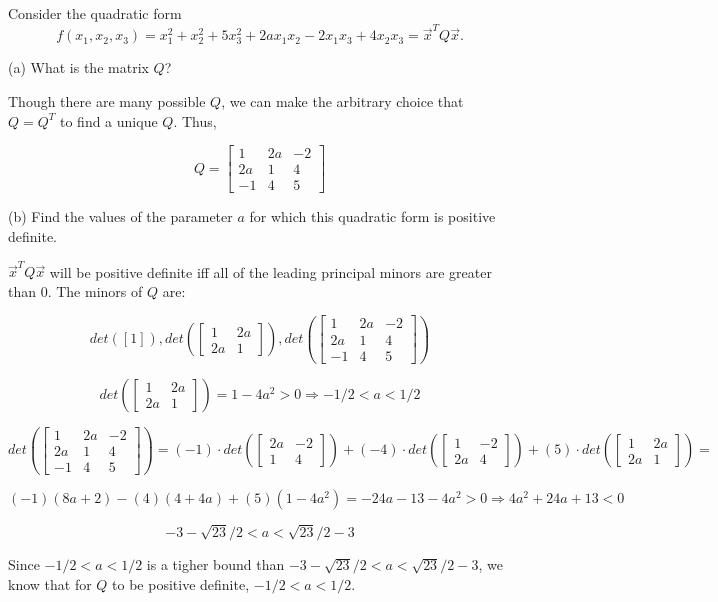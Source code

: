 \documentclass[12pt]{extarticle}
\theoremstyle{definition}
\begin{document}
\begin{problem}
Consider the quadratic form 
$$f(x_1,x_2,x_3)=x_1^2+x_2^2+5x_3^2+2ax_1x_2-2x_1x_3+4x_2x_3=\vec{x}^TQ\vec{x}.$$

	\begin{description}
		\item{(a)} What is the matrix $Q$?

		Though there are many possible $Q$, we can make the arbitrary choice that $Q=Q^T$ to find a unique $Q$. Thus,

		$$Q=\begin{bmatrix} 1 & 2a & -2\\ 2a & 1 & 4\\ -1 & 4 & 5\end{bmatrix}$$

		\item{(b)} Find the values of the parameter $a$ for which this quadratic form is positive definite.

		$\vec{x}^TQ\vec{x}$ will be positive definite iff all of the leading principal minors are greater than 0. The minors of $Q$ are:

		$$det([1]), det(\begin{bmatrix} 1 & 2a\\ 2a & 1 \end{bmatrix}), det(\begin{bmatrix} 1 & 2a & -2\\ 2a & 1 & 4\\ -1 & 4 & 5\end{bmatrix})$$

		$$det(\begin{bmatrix} 1 & 2a\\ 2a & 1 \end{bmatrix})=1-4a^2 > 0 \Longrightarrow -1/2 < a < 1/2$$

		$$det(\begin{bmatrix} 1 & 2a & -2\\ 2a & 1 & 4\\ -1 & 4 & 5\end{bmatrix}) = (-1)\cdot det(\begin{bmatrix} 2a & -2\\ 1 & 4\end{bmatrix}) + 
		(-4)\cdot det(\begin{bmatrix} 1 & -2\\ 2a & 4\end{bmatrix}) + (5)\cdot det(\begin{bmatrix} 1 & 2a\\ 2a & 1\end{bmatrix}) = $$

		$$(-1)(8a+2) - (4)(4+4a) + (5)(1-4a^2) = -24a-13-4a^2 > 0 \Longrightarrow 4a^2+24a+13 < 0$$

		$$-3-\sqrt{23}/2 < a < \sqrt{23}/2-3$$

		Since $-1/2 < a < 1/2$ is a tigher bound than $-3-\sqrt{23}/2 < a < \sqrt{23}/2-3$, we know that for $Q$ to be 
		positive definite, $-1/2 < a < 1/2$.
	\end{description}
\end{problem}
\end{document}
